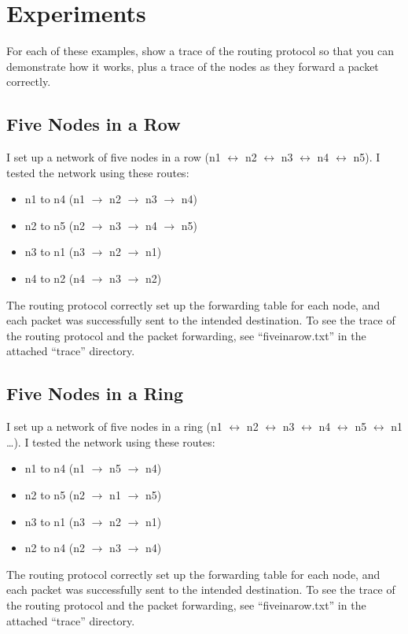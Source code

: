\documentclass[11pt]{article}
\begin{document}
\section{Experiments}

For each of these examples, show a trace of the routing protocol so that you can demonstrate how it works, plus a trace of the nodes as they forward a packet correctly.

\subsection{Five Nodes in a Row}
I set up a network of five nodes in a row (n1 $\leftrightarrow$ n2 $\leftrightarrow$ n3 $\leftrightarrow$ n4 $\leftrightarrow$ n5). I tested the network using these routes:
\begin{itemize}
  \item n1 to n4 (n1 $\rightarrow$ n2 $\rightarrow$ n3 $\rightarrow$ n4)
  \item n2 to n5 (n2 $\rightarrow$ n3 $\rightarrow$ n4 $\rightarrow$ n5)
  \item n3 to n1 (n3 $\rightarrow$ n2 $\rightarrow$ n1)
  \item n4 to n2 (n4 $\rightarrow$ n3 $\rightarrow$ n2)
\end{itemize}
The routing protocol correctly set up the forwarding table for each node, and each packet was successfully sent to the intended destination. To see the trace of the routing protocol and the packet forwarding, see ``fiveinarow.txt'' in the attached ``trace'' directory.

\subsection{Five Nodes in a Ring}
I set up a network of five nodes in a ring (n1 $\leftrightarrow$ n2 $\leftrightarrow$ n3 $\leftrightarrow$ n4 $\leftrightarrow$ n5 $\leftrightarrow$ n1 \ldots). I tested the network using these routes:
\begin{itemize}
  \item n1 to n4 (n1 $\rightarrow$ n5 $\rightarrow$ n4)
  \item n2 to n5 (n2 $\rightarrow$ n1 $\rightarrow$ n5)
  \item n3 to n1 (n3 $\rightarrow$ n2 $\rightarrow$ n1)
  \item n2 to n4 (n2 $\rightarrow$ n3 $\rightarrow$ n4)
\end{itemize}
The routing protocol correctly set up the forwarding table for each node, and each packet was successfully sent to the intended destination. To see the trace of the routing protocol and the packet forwarding, see ``fiveinarow.txt'' in the attached ``trace'' directory.
\end{document}
